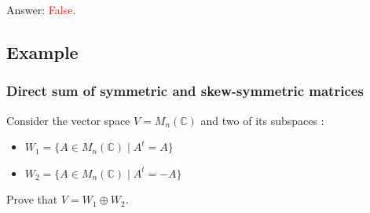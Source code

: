 \documentclass[12pt]{article}
\begin{document}
Answer: \textcolor{red}{False}.

\subsection{Example}

\subsubsection{Direct sum of symmetric and skew-symmetric matrices}
Consider the vector space $V=M_n(\mathbb{C})$ and two of its subspaces :
\begin{itemize}
    \item $W_1=\{A\in M_n(\mathbb{C})\mid A^t=A\}$
    \item $W_2=\{A\in M_n(\mathbb{C})\mid A^t=-A\}$
\end{itemize}

Prove that $V=W_1\oplus W_2$.
\end{document}
